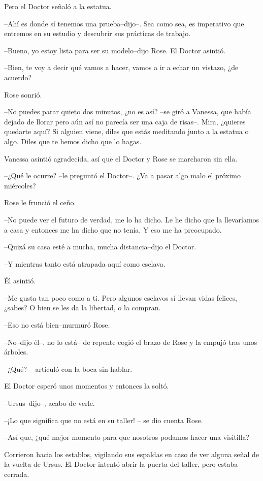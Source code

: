Pero el Doctor señaló a la estatua.

--Ahí es donde sí tenemos una prueba--dijo--. Sea como sea, es
imperativo que entremos en su estudio y descubrir sus prácticas de
trabajo.

--Bueno, yo estoy lista para ser su modelo--dijo Rose. El Doctor
asintió.

--Bien, te voy a decir qué vamos a hacer, vamos a ir a echar un vistazo,
¿de acuerdo?

Rose sonrió.

--No puedes parar quieto dos minutos, ¿no es así? --se giró a Vanessa,
que había dejado de llorar pero aún así no parecía ser una caja de
risas--. Mira, ¿quieres quedarte aquí? Si alguien viene, diles que estás
meditando junto a la estatua o algo. Diles que te hemos dicho que lo
hagas.

Vanessa asintió agradecida, así que el Doctor y Rose se marcharon sin
ella.

--¿Qué le ocurre? --le preguntó el Doctor--. ¿Va a pasar algo malo el
próximo miércoles?

Rose le frunció el ceño.

--No puede ver el futuro de verdad, me lo ha dicho. Le he dicho que la
llevaríamos a casa y entonces me ha dicho que no tenía. Y eso me ha
preocupado.

--Quizá su casa esté a mucha, mucha distancia--dijo el Doctor.

--Y mientras tanto está atrapada aquí como esclava.

Él asintió.

--Me gusta tan poco como a ti. Pero algunos esclavos sí llevan vidas
felices, ¿sabes? O bien se les da la libertad, o la compran.

--Eso no está bien--murmuró Rose.

--No--dijo él--, no lo está-- de repente cogió el brazo de Rose y la
empujó tras unos árboles.

--¿Qué? -- articuló con la boca sin hablar.

El Doctor esperó unos momentos y entonces la soltó.

--Ursus--dijo--, acabo de verle.

--¡Lo que significa que no está en su taller! -- se dio cuenta Rose.

--Así que, ¿qué mejor momento para que nosotros podamos hacer una
visitilla?

Corrieron hacia los establos, vigilando sus espaldas en caso de ver
alguna señal de la vuelta de Ursus. El Doctor intentó abrir la puerta
del taller, pero estaba cerrada.

